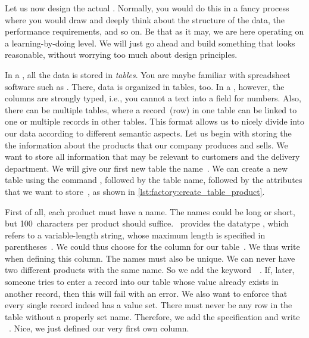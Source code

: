%
%
\label{sec:factoryCreatingTableAndInsertingData}%
%
Let us now design the actual \db.
Normally, you would do this in a fancy process where you would draw  and deeply think about the structure of the data, the performance requirements, and so on.
Be that as it may, we are here operating on a learning-by-doing level.
We will just go ahead and build something that looks reasonable, without worrying too much about design principles.

In a , all the data is stored in \emph{tables}.
You are maybe familiar with spreadsheet software such as \microsoftExcel.
There, data is organized in tables, too.
In a , however, the columns are strongly typed, i.e., you cannot  a text into a field for numbers.
Also, there can be multiple tables, where a record~(row) in one table can be linked to one or multiple records in other tables.
This format allows us to nicely divide into our data according to different semantic aspects.%
%
%
\label{sec:factory:table:product}%
%
Let us begin with storing the the information about the products that our company produces and sells.
We want to store all information that may be relevant to customers and the delivery department.
We will give our first new table the name~.%
%
%
%
%
%
%
We can create a new table using the command , followed by the table name, followed by the attributes that we want to store~\cite{PGDG:PD:CT2}, as shown in \cref{lst:factory:create_table_product}.

First of all, each product must have a name.
The names could be long or short, but 100~characters per product should suffice.
\sql\ provides the datatype , which refers to a variable-length string, whose maximum length is specified in parentheses~\cite{PGDG:PD:CT}.
We could thus choose  for the column  for our table~.
We thus write~ when defining this column.
The names must also be unique.
We can never have two different products with the same name.
So we add the keyword~~\cite{PGDG:PD:C}.
If, later, someone tries to enter a record into our table whose  value already exists in another record, then this will fail with an error.
We also want to enforce that every single record indeed has a  value set.
There must never be any row in the table without a properly set name.
Therefore, we add the  specification and write ~\cite{PGDG:PD:C}.
Nice, we just defined our very first own column.

